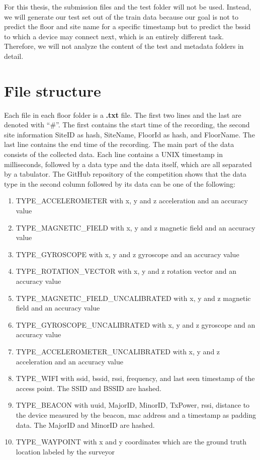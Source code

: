 For this thesis, the submission files and the test folder will not be used.
Instead, we will generate our test set out of the train data because our goal is not to predict the floor and site name for a specific timestamp but to predict the \ac{bssid} to which a device may connect next, which is an entirely different task.
Therefore, we will not analyze the content of the test and metadata folders in detail.


\section{File structure}\label{sec:file-structure}

Each file in each floor folder is a \textbf{.txt} file. 
The first two lines and the last are denoted with ``\#''.
The first contains the start time of the recording, the second site information SiteID as hash, SiteName, FloorId as hash, and FloorName.
The last line contains the end time of the recording.
The main part of the data consists of the collected data. 
Each line contains a UNIX timestamp in milliseconds, followed by a data type and the data itself, which are all separated by a tabulator.
The GitHub repository of the competition \cite{GitHubComp} shows that the data type in the second column followed by its data can be one of the following:

\begin{enumerate}
    \item\label{type:acce} TYPE\_ACCELEROMETER with x, y and z acceleration and an accuracy value
    \item\label{type:mag} TYPE\_MAGNETIC\_FIELD with x, y and z magnetic field and an accuracy value
    \item\label{type:gyro} TYPE\_GYROSCOPE with x, y and z gyroscope and an accuracy value
    \item\label{type:rot} TYPE\_ROTATION\_VECTOR with x, y and z rotation vector and an accuracy value
    \item\label{type:mag_u} TYPE\_MAGNETIC\_FIELD\_UNCALIBRATED with x, y and z magnetic field and an accuracy value
    \item\label{type:gyro_u} TYPE\_GYROSCOPE\_UNCALIBRATED with x, y and z gyroscope and an accuracy value
    \item\label{type:acce_u} TYPE\_ACCELEROMETER\_UNCALIBRATED with x, y and z acceleration and an accuracy value
    \item\label{type:wifi} TYPE\_WIFI with \ac{ssid}, \ac{bssid}, \ac{rssi}, frequency, and last seen timestamp of the access point. The SSID and BSSID are hashed.
    \item\label{type:beacon} TYPE\_BEACON with \ac{uuid}, \ac{MajorID}, \ac{MinorID}, \ac{TxPower}, \ac{rssi}, distance to the device measured by the beacon, \ac{mac} address and a timestamp as padding data. The MajorID and MinorID are hashed.
    \item\label{type:way} TYPE\_WAYPOINT with x and y coordinates which are the ground truth location labeled by the surveyor
\end{enumerate}

